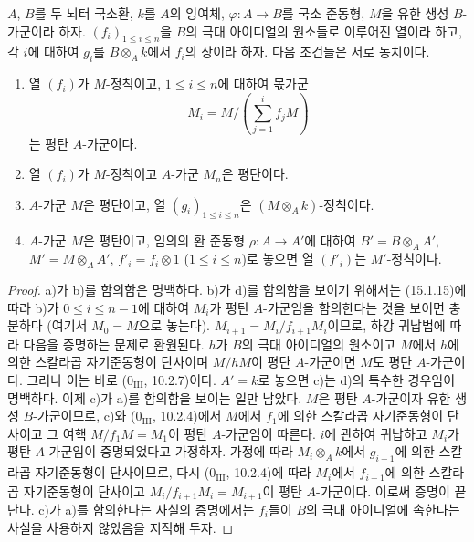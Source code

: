 \begin{proposition}[15.1.16]
\label{0.15.1.16-fr}
$A$, $B$를 두 뇌터 국소환, $k$를 $A$의 잉여체,
$\varphi:A\to B$를 국소 준동형, $M$을 유한 생성 $B$-가군이라 하자.
$(f_i)_{1\leq i\leq n}$을 $B$의 극대 아이디얼의 원소들로 이루어진
열이라 하고, 각 $i$에 대하여 $g_i$를 $B\otimes_A k$에서 $f_i$의
상이라 하자. 다음 조건들은 서로 동치이다.
\begin{enumerate}
  \item[\rm(a)] 열 $(f_i)$가 $M$-정칙이고, $1\leq i\leq n$에 대하여
  몫가군
  \[
    M_i=M/\left(\sum_{j=1}^i f_jM\right)
  \]
  는 평탄 $A$-가군이다.
  \item[\rm(b)] 열 $(f_i)$가 $M$-정칙이고 $A$-가군 $M_n$은 평탄이다.
  \item[\rm(c)] $A$-가군 $M$은 평탄이고, 열
  $(g_i)_{1\leq i\leq n}$은 $(M\otimes_A k)$-정칙이다.
  \item[\rm(d)] $A$-가군 $M$은 평탄이고, 임의의 환 준동형
  $\rho:A\to A'$에 대하여 $B'=B\otimes_A A'$,
  $M'=M\otimes_A A'$, $f'_i=f_i\otimes1$ ($1\leq i\leq n$)로
  놓으면 열 $(f'_i)$는 $M'$-정칙이다.
\end{enumerate}
\end{proposition}

\begin{proof}
a)가 b)를 함의함은 명백하다. b)가 d)를 함의함을 보이기 위해서는
(15.1.15)에 따라 b)가 $0\leq i\leq n-1$에 대하여 $M_i$가 평탄
$A$-가군임을 함의한다는 것을 보이면 충분하다 (여기서 $M_0=M$으로
놓는다). $M_{i+1}=M_i/f_{i+1}M_i$이므로, 하강 귀납법에 따라 다음을
증명하는 문제로 환원된다. $h$가 $B$의 극대 아이디얼의 원소이고
$M$에서 $h$에 의한 스칼라곱 자기준동형이 단사이며 $M/hM$이 평탄
$A$-가군이면 $M$도 평탄 $A$-가군이다. 그러나 이는 바로
($0_{\mathrm{III}}$, 10.2.7)이다. $A'=k$로 놓으면 c)는 d)의 특수한
경우임이 명백하다. 이제 c)가 a)를 함의함을 보이는 일만 남았다.
$M$은 평탄 $A$-가군이자 유한 생성 $B$-가군이므로, c)와
($0_{\mathrm{III}}$, 10.2.4)에서 $M$에서 $f_1$에 의한 스칼라곱
자기준동형이 단사이고 그 여핵 $M/f_1M=M_1$이 평탄 $A$-가군임이
따른다. $i$에 관하여 귀납하고 $M_i$가 평탄 $A$-가군임이 증명되었다고
가정하자. 가정에 따라 $M_i\otimes_A k$에서 $g_{i+1}$에 의한
스칼라곱 자기준동형이 단사이므로, 다시 ($0_{\mathrm{III}}$, 10.2.4)에
따라 $M_i$에서 $f_{i+1}$에 의한 스칼라곱 자기준동형이 단사이고
$M_i/f_{i+1}M_i=M_{i+1}$이 평탄 $A$-가군이다. 이로써 증명이
끝난다. c)가 a)를 함의한다는 사실의 증명에서는 $f_i$들이 $B$의
극대 아이디얼에 속한다는 사실을 사용하지 않았음을 지적해 두자.
\end{proof}

